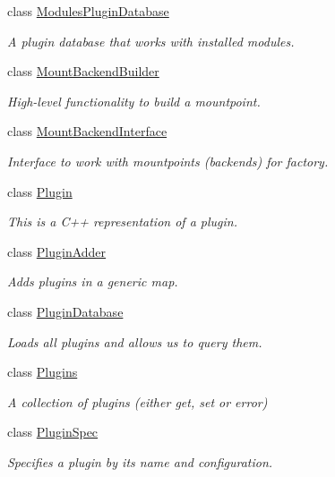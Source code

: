 \begin{DoxyCompactItemize}
class \hyperlink{classkdb_1_1tools_1_1ModulesPluginDatabase}{Modules\+Plugin\+Database}
\begin{DoxyCompactList}\small\item\em A plugin database that works with installed modules. \end{DoxyCompactList}\item 
class \hyperlink{classkdb_1_1tools_1_1MountBackendBuilder}{Mount\+Backend\+Builder}
\begin{DoxyCompactList}\small\item\em High-\/level functionality to build a mountpoint. \end{DoxyCompactList}\item 
class \hyperlink{classkdb_1_1tools_1_1MountBackendInterface}{Mount\+Backend\+Interface}
\begin{DoxyCompactList}\small\item\em Interface to work with mountpoints (backends) for factory. \end{DoxyCompactList}\item 
class \hyperlink{classkdb_1_1tools_1_1Plugin}{Plugin}
\begin{DoxyCompactList}\small\item\em This is a C++ representation of a plugin. \end{DoxyCompactList}\item 
class \hyperlink{classkdb_1_1tools_1_1PluginAdder}{Plugin\+Adder}
\begin{DoxyCompactList}\small\item\em Adds plugins in a generic map. \end{DoxyCompactList}\item 
class \hyperlink{classkdb_1_1tools_1_1PluginDatabase}{Plugin\+Database}
\begin{DoxyCompactList}\small\item\em Loads all plugins and allows us to query them. \end{DoxyCompactList}\item 
class \hyperlink{classkdb_1_1tools_1_1Plugins}{Plugins}
\begin{DoxyCompactList}\small\item\em A collection of plugins (either get, set or error) \end{DoxyCompactList}\item 
class \hyperlink{classkdb_1_1tools_1_1PluginSpec}{Plugin\+Spec}
\begin{DoxyCompactList}\small\item\em Specifies a plugin by its name and configuration. \end{DoxyCompactList}\item 

\end{DoxyCompactItemize}
